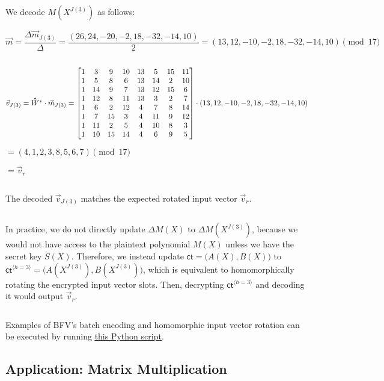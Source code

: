 We decode $M(X^{J(3)})$ as follows: 

$\vec{m} = \dfrac{\Delta \vec{m}_{J(3)}}{\Delta} = \dfrac{(26, 24, -20, -2, 18, -32, -14, 10)}{2} = (13, 12, -10, -2, 18, -32, -14, 10) \pmod{17}$

$ $


$\vec{v}_{J(3)} = \hathat{W}^* \cdot \vec{m}_{J(3)} = \begin{bmatrix}
1&3&9&10&13&5&15&11\\
1&5&8&6&13&14&2&10\\
1&14&9&7&13&12&15&6\\
1&12&8&11&13&3&2&7\\
1&6&2&12&4&7&8&14\\
1&7&15&3&4&11&9&12\\
1&11&2&5&4&10&8&3\\
1&10&15&14&4&6&9&5\\
\end{bmatrix} \cdot (13, 12, -10, -2, 18, -32, -14, 10) $

$= (4, 1, 2, 3, 8, 5, 6, 7) \pmod{17}$

$= \vec{v}_r$

$ $

The decoded $\vec{v}_{J(3)}$ matches the expected rotated input vector $\vec{v}_r$.  


$ $

In practice, we do not directly update $\Delta M(X)$ to $\Delta M(X^{J(3)})$, because we would not have access to the plaintext polynomial $M(X)$ unless we have the secret key $S(X)$. Therefore, we instead update $\textsf{ct}=\bm(A(X), B(X)\bm)$ to $\textsf{ct}^{\langle h=3 \rangle}=\bm(A(X^{J(3)}), B(X^{J(3)})\bm)$, which is equivalent to homomorphically rotating the encrypted input vector slots. Then, decrypting $\textsf{ct}^{\langle h=3 \rangle}$ and decoding it would output $\vec{v}_r$.

$ $




 Examples of BFV's batch encoding and homomorphic input vector rotation can be executed by running \href{https://github.com/gogo9th/fhe-textbook/blob/main/source%20code/bfv.py}{\underline{this Python script}}. 



\subsection{Application: Matrix Multiplication}
\label{subsec:bfv-matrix-multiplication}

